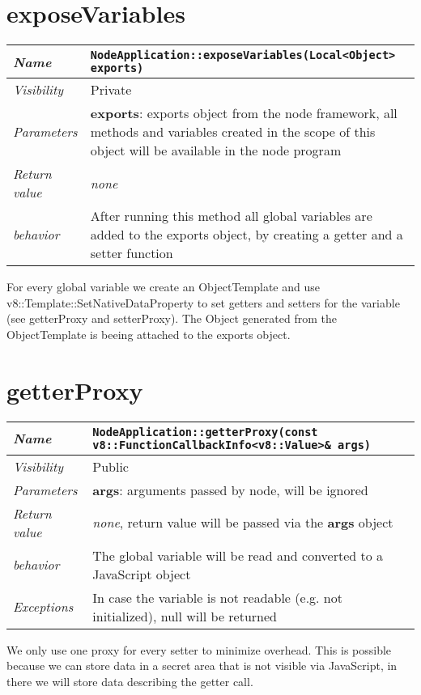 \section{exposeVariables}
\begin{longtable}{p{3cm} @{\hskip 1cm} p{12cm}}
  \hline
  \textit{Name} & \texttt{NodeApplication::exposeVariables(Local<Object> exports)} \\
  \hline
  \textit{Visibility} & Private \\
  \hline
  \textit{Parameters} & \textbf{exports}: exports object from the node framework, all methods and variables created in the scope of this object will be available in the node program \\
  \hline
  \textit{Return value} & \textit{none} \\
  \hline
  \textit{behavior} & After running this method all global variables are added to the exports object, by creating a getter and a setter function \\
  \hline
\end{longtable}

For every global variable we create an ObjectTemplate and use v8::Template::SetNativeDataProperty to set getters and setters for the variable (see getterProxy and setterProxy).
The Object generated from the ObjectTemplate is beeing attached to the exports object.

\newpage
\section{getterProxy}
\begin{longtable}{p{3cm} @{\hskip 1cm} p{12cm}}
  \hline
  \textit{Name} & \texttt{NodeApplication::getterProxy(const v8::FunctionCallbackInfo<v8::Value>\& args)} \\
  \hline
  \textit{Visibility} & Public \\
  \hline
  \textit{Parameters} & \textbf{args}: arguments passed by node, will be ignored \\
  \hline
  \textit{Return value} & \textit{none}, return value will be passed via the \textbf{args} object \\
  \hline
  \textit{behavior} & The global variable will be read and converted to a JavaScript object\\
  \hline
  \textit{Exceptions} & In case the variable is not readable (e.g. not initialized), null will be returned \\
  \hline
\end{longtable}
We only use one proxy for every setter to minimize overhead. This is possible because we can store data in a secret area that is not visible via JavaScript, in there we will store data describing the getter call.
\newpage
